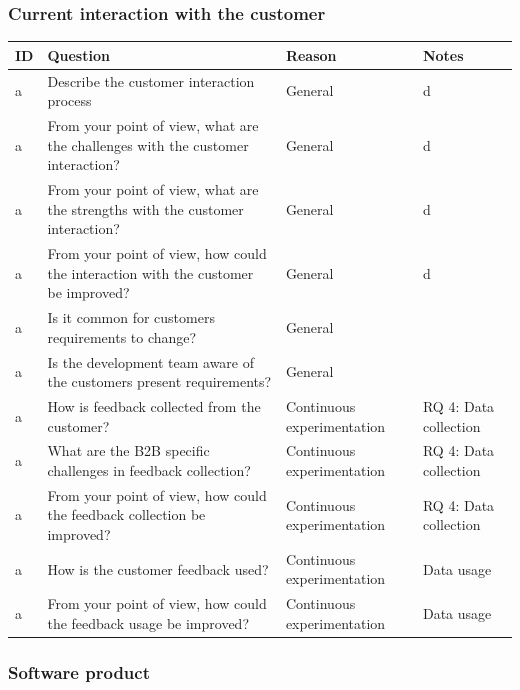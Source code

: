\documentclass[english]{tktltiki2}
\theoremstyle{definition}
\theoremstyle{remark}
\begin{document}
\subsubsection{Current interaction with the customer}

\begin{center}
    \begin{tabular}{ | l | l | l | p{5cm} |}
    \hline
    ID & Question & Reason & Notes \\ \hline
    a & Describe the customer interaction process & General & d \\ \hline
    a & From your point of view, what are the challenges with the customer interaction? & General & d \\ \hline
    a & From your point of view, what are the strengths with the customer interaction? & General & d \\ \hline
    a & From your point of view, how could the interaction with the customer be improved? & General & d \\ \hline
	a & Is it common for customers requirements to change? & General &  \\ \hline
    a & Is the development team aware of the customers present requirements? & General &  \\ \hline

	a & How is feedback collected from the customer? & Continuous experimentation & RQ 4: Data collection \\ \hline
	a & What are the B2B specific challenges in feedback collection? & Continuous experimentation & RQ 4: Data collection \\ \hline
	a & From your point of view, how could the feedback collection be improved? & Continuous experimentation & RQ 4: Data collection \\ \hline
	a & How is the customer feedback used? & Continuous experimentation & Data usage \\ \hline	
	a & From your point of view, how could the feedback usage be improved? & Continuous experimentation & Data usage \\ \hline

    \hline
    \end{tabular}
\end{center}

\subsubsection{Software product}
\end{document}
